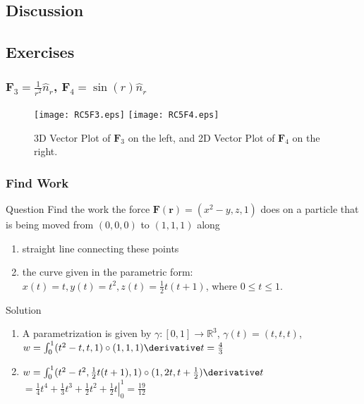 \subsection{Discussion}
\subsection{Exercises}
\begin{frame}
\frametitle{$\mathbf{F}_3=\frac{1}{r^2}\hat{n}_r$, $\mathbf{F}_4=\sin(r)\hat{n}_r$}
\begin{figure}
\centering
\texttt{[image: RC5F3.eps]}
\texttt{[image: RC5F4.eps]}
\caption{3D Vector Plot of $\mathbf{F}_3$ on the left, and 2D Vector Plot of $\mathbf{F}_4$ on the right.}
\end{figure}
\end{frame}
\begin{frame}
\frametitle{Find Work}
\begin{block}{Question}
Find the work the force $\mathbf{F}(\mathbf{r})=(x^2-y,z,1)$ does on a particle that is being moved from $(0,0,0)$ to $(1,1,1)$ along
\begin{enumerate}
\item{straight line connecting these points}
\item{the curve given in the parametric form: $x(t)=t, y(t)=t^2, z(t)=\frac{1}{2}t(t+1)$, where $0\leq t\leq 1$.}
\end{enumerate}
\end{block}
\begin{block}{Solution}
\begin{enumerate}
\item{A parametrization is given by $\gamma: [0,1]\to \mathbb{R}^3$, $\gamma(t)=(t,t,t)$, $w=\int_0^1(t^2-t,t,1)\circ (1,1,1)\derivative t=\frac{4}{3}$}
\item{$w=\int_0^1(t^2-t^2,\frac{1}{2}t(t+1),1)\circ(1,2t,t+\frac{1}{2})\derivative t$$=\left.\frac{1}{4}t^4+\frac{1}{3}t^3+\frac{1}{2}t^2+\frac{1}{2}t\right|_0^1=\frac{19}{12}$}
\end{enumerate}
\end{block}
\end{frame}
